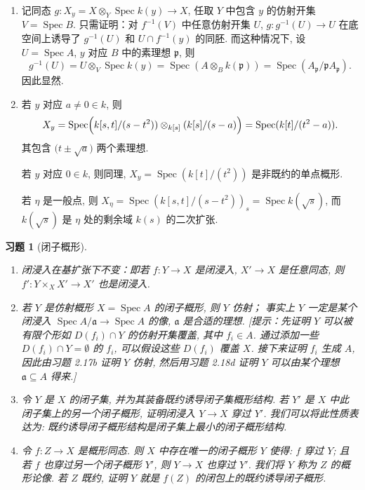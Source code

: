 \documentclass{article}
\theoremstyle{exercise}
\newtheorem{exercise}{习题}[section]
\newenvironment{proofc}{\proof}{\endproof}
\def\ga{\mathfrak{a}}
\def\gp{\mathfrak{p}}
\def\Spec{\operatorname{Spec}}
\begin{document}
\begin{proofc}
  \begin{enumerate}[label={(\alph*)}]
    \item 记同态 $g \colon X_y = X \otimes_Y \Spec k(y) \to X$,
          任取 $Y$ 中包含 $y$ 的仿射开集 $V = \Spec B$.
          只需证明：对 $f^{-1}(V)$ 中任意仿射开集 $U$, $g \colon g^{-1}(U) \to U$
          在底空间上诱导了 $g^{-1}(U)$ 和 $U \cap f^{-1}(y)$ 的同胚.
          而这种情况下, 设 $U = \Spec A$, $y$ 对应 $B$ 中的素理想 $\gp$,
          则
          \[
          g^{-1}(U) = U \otimes_V \Spec k(y) = \Spec (A \otimes_B k(\gp))
          = \Spec (A_{\gp} / \gp A_{\gp}).
          \]
          因此显然.
    \item 若 $y$ 对应 $a \neq 0 \in k$, 则
          \[
          X_y = \Spec \Bigl(k[s, t] / (s - t^2)) \otimes_{k[s]} (k[s] / (s - a)\Bigr)
          = \Spec (k[t] / (t^2 - a)).
          \]
          其包含 $\bigl(t \pm \sqrt{a}\bigr)$ 两个素理想.

          若 $y$ 对应 $0 \in k$, 则同理, $X_y = \Spec (k[t] / (t^2))$
          是非既约的单点概形.

          若 $\eta$ 是一般点, 则 $X_{\eta} = \Spec (k[s, t] / (s - t^2))_s = \Spec k(\sqrt{s})$,
          而 $k(\sqrt{s})$ 是 $\eta$ 处的剩余域 $k(s)$ 的二次扩张.
          \qedhere
  \end{enumerate}
\end{proofc}

\begin{exercise}[闭子概形]
  \begin{enumerate}[label={(\alph*)}]
    \item 闭浸入在基扩张下不变：即若 $f \colon Y \to X$ 是闭浸入, $X' \to X$ 是任意同态,
          则 $f' \colon Y \times_X X' \to X'$ 也是闭浸入.
    \item 若 $Y$ 是仿射概形 $X = \Spec A$ 的闭子概形, 则 $Y$ 仿射；
          事实上 $Y$ 一定是某个闭浸入 $\Spec A / \ga \to \Spec A$ 的像, $\ga$ 是合适的理想.
          [\emph{提示：先证明 $Y$ 可以被有限个形如 $D(f_i) \cap Y$ 的仿射开集覆盖,
          其中 $f_i \in A$. 通过添加一些 $D(f_i) \cap Y = \emptyset$ 的 $f_i$,
          可以假设这些 $D(f_i)$ 覆盖 $X$. 接下来证明 $f_i$ 生成 $A$,
          因此由习题 2.17b 证明 $Y$ 仿射,
          然后用习题 2.18d 证明 $Y$ 可以由某个理想 $\ga \subseteq A$ 得来.}]
    \item 令 $Y$ 是 $X$ 的闭子集, 并为其装备既约诱导闭子集概形结构.
          若 $Y'$ 是 $X$ 中此闭子集上的另一个闭子概形,
          证明闭浸入 $Y \to X$ 穿过 $Y'$.
          我们可以将此性质表达为: 既约诱导闭子概形结构是闭子集上最小的闭子概形结构.
    \item 令 $f \colon Z \to X$ 是概形同态. 则 $X$ 中存在唯一的闭子概形 $Y$ 使得:
          $f$ 穿过 $Y$; 且若 $f$ 也穿过另一个闭子概形 $Y'$, 则 $Y \to X$ 也穿过 $Y'$.
          我们将 $Y$ 称为 $Z$ 的\emph{概形论像}.
          若 $Z$ 既约, 证明 $Y$ 就是 $f(Z)$ 的闭包上的既约诱导闭子概形.
  \end{enumerate}
\end{exercise}
\end{document}
